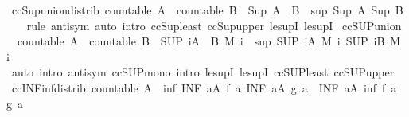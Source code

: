 \begin{isabellebody}
\endisatagproof
{\isafoldproof}%
%
\isadelimproof
\isanewline
%
\endisadelimproof
\isanewline
{}\isamarkupfalse%
\ ccSup{\isacharunderscore}union{\isacharunderscore}distrib{\isacharcolon}\ {\isachardoublequoteopen}countable\ A\ {\isasymLongrightarrow}\ countable\ B\ {\isasymLongrightarrow}\ Sup\ {\isacharparenleft}A\ {\isasymunion}\ B{\isacharparenright}\ {\isacharequal}\ sup\ {\isacharparenleft}Sup\ A{\isacharparenright}\ {\isacharparenleft}Sup\ B{\isacharparenright}{\isachardoublequoteclose}\isanewline
%
\isadelimproof
\ \ %
\endisadelimproof
%
\isatagproof
{}\isamarkupfalse%
\ {\isacharparenleft}rule\ antisym{\isacharparenright}\ {\isacharparenleft}auto\ intro{\isacharcolon}\ ccSup{\isacharunderscore}least\ ccSup{\isacharunderscore}upper\ le{\isacharunderscore}supI{}\ le{\isacharunderscore}supI{}{\isacharparenright}%
\endisatagproof
{\isafoldproof}%
%
\isadelimproof
\isanewline
%
\endisadelimproof
\isanewline
{}\isamarkupfalse%
\ ccSUP{\isacharunderscore}union{\isacharcolon}\isanewline
\ \ {\isachardoublequoteopen}countable\ A\ {\isasymLongrightarrow}\ countable\ B\ {\isasymLongrightarrow}\ {\isacharparenleft}SUP\ i{\isacharcolon}A\ {\isasymunion}\ B{\isachardot}\ M\ i{\isacharparenright}\ {\isacharequal}\ sup\ {\isacharparenleft}SUP\ i{\isacharcolon}A{\isachardot}\ M\ i{\isacharparenright}\ {\isacharparenleft}SUP\ i{\isacharcolon}B{\isachardot}\ M\ i{\isacharparenright}{\isachardoublequoteclose}\isanewline
%
\isadelimproof
\ \ %
\endisadelimproof
%
\isatagproof
{}\isamarkupfalse%
\ {\isacharparenleft}auto\ intro{\isacharbang}{\isacharcolon}\ antisym\ ccSUP{\isacharunderscore}mono\ intro{\isacharcolon}\ le{\isacharunderscore}supI{}\ le{\isacharunderscore}supI{}\ ccSUP{\isacharunderscore}least\ ccSUP{\isacharunderscore}upper{\isacharparenright}%
\endisatagproof
{\isafoldproof}%
%
\isadelimproof
\isanewline
%
\endisadelimproof
\isanewline
{}\isamarkupfalse%
\ ccINF{\isacharunderscore}inf{\isacharunderscore}distrib{\isacharcolon}\ {\isachardoublequoteopen}countable\ A\ {\isasymLongrightarrow}\ inf\ {\isacharparenleft}INF\ a{\isacharcolon}A{\isachardot}\ f\ a{\isacharparenright}\ {\isacharparenleft}INF\ a{\isacharcolon}A{\isachardot}\ g\ a{\isacharparenright}\ {\isacharequal}\ {\isacharparenleft}INF\ a{\isacharcolon}A{\isachardot}\ inf\ {\isacharparenleft}f\ a{\isacharparenright}\ {\isacharparenleft}g\ a{\isacharparenright}{\isacharparenright}{\isachardoublequoteclose}\isanewline
%
\isadelimproof
\ \ %
\endisadelimproof
%
\isatagproof

\end{isabellebody}
